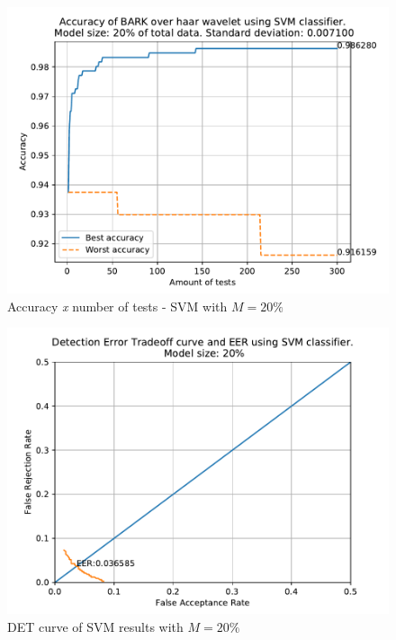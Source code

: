 		\begin{figure}[H]
			\centering
			\includegraphics[scale=.8]{images/results/confusionMatrices/classifier_SVM_20.pdf}
			\caption{Accuracy \textit{x} number of tests - SVM with $M=20\%$}
			\label{fig:classifiersvm20}
		\end{figure}
		\begin{figure}[H]
			\centering
			\includegraphics[scale=.8]{images/results/det/DET_for_classifier_SVM_20.pdf}
			\caption{DET curve of SVM results with $M=20\%$}
			\label{fig:detsvm20}
		\end{figure}
